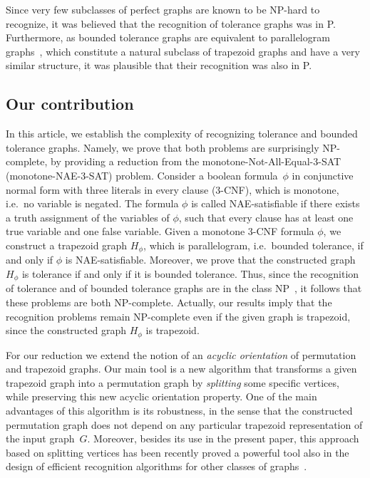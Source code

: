 \documentclass[proceedings]{stacs}
\begin{document}
Since very few subclasses of perfect graphs are known to be NP-hard to recognize, 
it was believed that the recognition of tolerance graphs was in P. 
Furthermore, as bounded tolerance graphs are equivalent to parallelogram graphs~\cite{Langley93,BFI95}, 
which constitute a natural subclass of trapezoid graphs and have a very similar structure, 
it was plausible that their recognition was also in P.

\subsection{Our contribution\label{contribution}}

In this article, we establish the complexity of 
recognizing tolerance and bounded tolerance graphs. 
Namely, we prove that both problems are surprisingly NP-complete, by providing a 
reduction from the monotone-Not-All-Equal-3-SAT (monotone-NAE-3-SAT) problem. 
Consider a boolean formula~$\phi $ in
conjunctive normal form with three literals in every clause (3-CNF), which
is monotone, i.e.~no variable is negated. The formula $\phi $ is called
NAE-satisfiable if there exists a truth assignment of the variables of $\phi 
$, such that every clause has at least one true variable and one false
variable. Given a monotone 3-CNF formula $\phi $, we construct a trapezoid
graph $H_{\phi }$, which is parallelogram, i.e.~bounded tolerance, if and
only if $\phi $ is NAE-satisfiable. Moreover, we prove that the constructed
graph $H_{\phi }$ is tolerance if and only if it is bounded tolerance. Thus,
since the recognition of tolerance and of bounded tolerance graphs are in
the class NP~\cite{HaSh04}, it follows that these problems are both
NP-complete. Actually, our results imply that the recognition problems
remain NP-complete even if the given graph is trapezoid, since the
constructed graph $H_{\phi }$ is trapezoid.

For our reduction we extend the notion of an \emph{acyclic orientation} of permutation and trapezoid graphs. 
Our main tool is a new algorithm that transforms a given trapezoid graph into a permutation graph 
by \emph{splitting} some specific vertices, while preserving this new acyclic orientation property. 
One of the main advantages of this algorithm is its robustness, in the sense that the constructed 
permutation graph does not depend on any particular trapezoid representation of the input graph~$G$. 
Moreover, besides its use in the present paper, this approach based on splitting vertices has been 
recently proved a powerful tool also in the design of efficient recognition algorithms for other 
classes of graphs~\cite{MC-Trapezoid}. 
\end{document}
